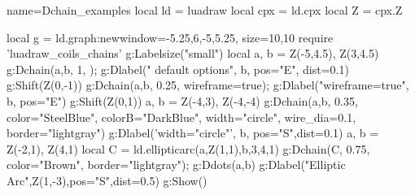 \begin{luadraw}{name=Dchain_examples}
local ld = luadraw
local cpx = ld.cpx
local Z = cpx.Z

local g = ld.graph:new{window={-5.25,6,-5,5.25}, size={10,10}}
require 'luadraw_coils_chains'
g:Labelsize("small")
local a, b = Z(-5,4.5), Z(3,4.5)
g:Dchain({a,b}, 1, {}); g:Dlabel(" default options", b, {pos="E", dist=0.1})
g:Shift(Z(0,-1))
g:Dchain({a,b}, 0.25, {wireframe=true}); g:Dlabel("wireframe=true", b, {pos="E"})
g:Shift(Z(0,1))
a, b = Z(-4,3), Z(-4,-4)
g:Dchain({a,b}, 0.35, {color="SteelBlue", colorB="DarkBlue", width="circle", wire_dia=0.1, border="lightgray"})
g:Dlabel('width="circle"', b, {pos="S",dist=0.1})
a, b = Z(-2,1), Z(4,1)
local C = ld.ellipticarc(a,Z(1,1),b,3,4,1)
g:Dchain(C, 0.75, {color="Brown", border="lightgray"}); g:Ddots({a,b})
g:Dlabel("Elliptic Arc",Z(1,-3),{pos="S",dist=0.5})
g:Show()
\end{luadraw}
